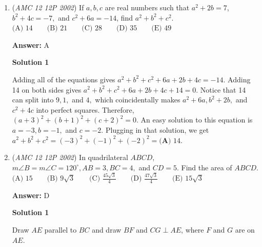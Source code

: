 \begin{enumerate}
 $\text{(A) }1-\sqrt{2}\sin{60^\circ}=1-\frac{\sqrt{6}}{2} \neq \frac{-1}{2}.$
$\text{(B) }1+\sqrt{2}\cos{60^\circ}=1+\frac{\sqrt{2}}{2} \neq \frac{-1}{2}.$
$\text{(C) }\cos{\frac{60^\circ}{2}} - \sin{\frac{60^\circ}{2}}=\frac{\sqrt{3}}{2}-1 \neq \frac{-1}{2}.$
$\text{(D) }\cos{60^\circ} - \sin{60^\circ}=\frac{1-\sqrt{3}}{2} \neq \frac{-1}{2}.$
$\text{(E) }\cos {120^\circ}=\frac{-1}{2}.$

 Therefore, our answer is $\boxed{\textbf{(E) } \cos {2x}}$.

 Comment: If you decide to cheese the problem, be very careful not to choose any $x$ where $x$ is a multiple of $\frac{\pi}{4}$. It turns out that all of them except for $\frac{7\pi}{4} + 2\pi k$ result in equality between the correct answer and one or more wrong answers, which one could quickly verify by setting two choices equal and solving for $x$.

 


	\item (\textit{AMC 12 12P 2002}) If $a,b,c$ are real numbers such that $a^2 + 2b =7$, $b^2 + 4c= -7,$ and $c^2 + 6a= -14$, find $a^2 + b^2 + c^2.$
$\text{(A) }14 \qquad \text{(B) }21 \qquad \text{(C) }28 \qquad \text{(D) }35 \qquad \text{(E) }49$

 \textbf{Answer: }A



\textbf{Solution 1}

Adding all of the equations gives $a^2 + b^2 +c^2 + 6a + 2b + 4c=-14.$ Adding 14 on both sides gives $a^2 + b^2 +c^2 + 6a + 2b + 4c+14=0.$ Notice that 14 can split into $9, 1,$ and $4,$ which coincidentally makes $a^2 +6a, b^2+2b,$ and $c^2+4c$ into perfect squares. Therefore, $(a+3)^2 + (b+1)^2 + (c+2) ^2 =0.$ An easy solution to this equation is $a=-3, b=-1,$ and $c=-2.$ Plugging in that solution, we get $a^2+b^2+c^2=(-3)^2+(-1)^2+(-2)^2=\boxed{\textbf{(A) } 14}.$



	\item (\textit{AMC 12 12P 2002}) In quadrilateral $ABCD$, $m\angle B = m \angle C = 120^{\circ}, AB=3, BC=4,$ and $CD=5.$ Find the area of $ABCD.$
$\text{(A) }15 \qquad \text{(B) }9 \sqrt{3} \qquad \text{(C) }\frac{45 \sqrt{3}}{4} \qquad \text{(D) }\frac{47 \sqrt{3}}{4} \qquad \text{(E) }15 \sqrt{3}$

 \textbf{Answer: }D



\textbf{Solution 1}

Draw $AE$ parallel to $BC$ and draw $BF$ and $CG \perp AE$, where $F$ and $G$ are on $AE$.


\end{enumerate}
